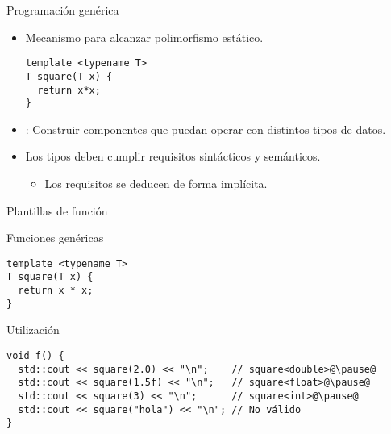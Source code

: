 \begin{frame}[t,fragile]{Programación genérica}
\begin{itemize}
  \item Mecanismo para alcanzar polimorfismo estático.
\begin{lstlisting}
template <typename T>
T square(T x) {
  return x*x;
}
\end{lstlisting}

  \pause\vfill
  \item {}: Construir componentes que puedan operar con
        distintos tipos de datos.

  \pause\vfill
  \item Los tipos deben cumplir requisitos sintácticos y semánticos.
    \begin{itemize}
      \item Los requisitos se deducen de forma implícita.
    \end{itemize}
\end{itemize}
\end{frame}

\begin{frame}[t,fragile]{Plantillas de función}
\begin{block}{Funciones genéricas}
\begin{lstlisting}
template <typename T>
T square(T x) {
  return x * x;
}
\end{lstlisting}
\end{block}

\vfill\pause

\begin{block}{Utilización}
\begin{lstlisting}[escapechar=@]
void f() {
  std::cout << square(2.0) << "\n";    // square<double>@\pause@
  std::cout << square(1.5f) << "\n";   // square<float>@\pause@
  std::cout << square(3) << "\n";      // square<int>@\pause@
  std::cout << square("hola") << "\n"; // No válido
}
\end{lstlisting}
\end{block}

\end{frame}


